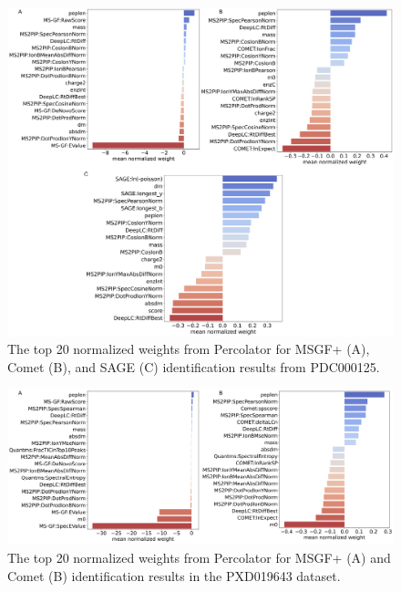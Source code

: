\documentclass[12pt]{article}
\begin{document}
\begin{figure}[ht!]
	\centering
	\includegraphics[width=1\textwidth]{figures//CPTAC_weights.png}
	\caption{The top 20 normalized weights from Percolator for MSGF+ (A), Comet (B), and SAGE (C) identification results from PDC000125.}
	\label{fig:PDC_ms2rescore_weights}
\end{figure}

\begin{figure}[ht!]
	\centering
	\includegraphics[width=1\textwidth]{figures//PXD019643_weights.png}
	\caption{The top 20 normalized weights from Percolator for MSGF+ (A) and Comet (B) identification results in the PXD019643 dataset.}
	\label{fig:PXD019643_features}
\end{figure}
\end{document}
